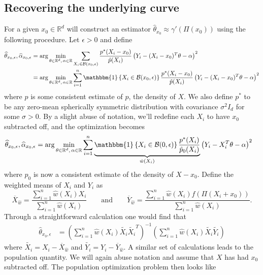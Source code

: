 \documentclass[11pt]{article}
\begin{document}
\subsection{Recovering the underlying curve}
For a given $x_0 \in \mathbb{R}^d$ will construct an estimator $\widehat{\theta}_{x_0} \approx \gamma'(\Pi(x_0))$ using the following procedure. Let $\epsilon > 0$ and define
\begin{align} 
\widehat{\theta}_{x_0,\epsilon}, \widehat{\alpha}_{x_0, \epsilon} &= \arg\min_{\theta \in \mathbb{R}^d,\, \alpha \in \mathbb{R}} \sum_{X_i \in \mathcal{B}(x_0, \epsilon)}\frac{p^*(X_i - x_0)}{\hat{p}(X_i)}\left(Y_i - (X_i - x_0)^{T}\theta - \alpha\right)^2 \\
&= \arg\min_{\theta \in \mathbb{R}^d,\, \alpha \in \mathbb{R}} \sum_{i = 1}^{n}\mathbbm{1}\left\{X_i \in \mathcal{B}(x_0, \epsilon)\right\}\frac{p^*(X_i - x_0)}{\hat{p}(X_i)}\left(Y_i - (X_i - x_0)^{T}\theta - \alpha\right)^2
\end{align}
where $\hat{p}$ is some consistent estimate of $p$, the density of $X$. We also define $p^*$ to be any zero-mean spherically symmetric distribution with covariance $\sigma^2I_d$ for some $\sigma > 0$. By a slight abuse of notation, we'll redefine each $X_i$ to have $x_0$ subtracted off, and the optimization becomes 
\begin{align} 
\widehat{\theta}_{x_0,\epsilon}, \widehat{\alpha}_{x_0, \epsilon} &= \arg\min_{\theta \in \mathbb{R}^d,\, \alpha \in \mathbb{R}} \sum_{i = 1}^{n}\underbrace{\mathbbm{1}\left\{X_i \in \mathcal{B}(0, \epsilon)\right\}\frac{p^*(X_i)}{\hat{p}_0(X_i)}}_{\hat{w}(X_i)}\left(Y_i - X_i^{T}\theta - \alpha\right)^2
\end{align}
where $\hat{p}_0$ is now a consistent estimate of the density of $X - x_0$. Define the weighted means of $X_i$ and $Y_i$ as 
\begin{equation}
    \overline{X}_{\hat{w}} = \frac{\sum_{i = 1}^n \hat{w}(X_i)X_i}{\sum_{i = 1}^n \hat{w}(X_i)} \qquad \text{and} \qquad \overline{Y}_{\hat{w}} = \frac{\sum_{i = 1}^n \hat{w}(X_i)f(\Pi(X_i+x_0))}{\sum_{i = 1}^n \hat{w}(X_i)}.
\end{equation}
Through a straightforward calculation one would find that
\begin{align}
    \widehat{\theta}_{x_0,\epsilon} &= \left(\sum_{i = 1}^n\hat{w}(X_i)\tilde{X_i}\tilde{X_i}^T\right)^{-1}\left(\sum_{i = 1}^n\hat{w}(X_i)\tilde{X_i}\tilde{Y_i}\right) \label{eq: sample est closed form}
\end{align}
where $\tilde{X_i} = X_i - \overline{X}_{\hat{w}}$ and $\tilde{Y_i} = Y_i - \overline{Y}_{\hat{w}}$. A similar set of calculations leads to the population quantity. We will again abuse notation and assume that $X$ has had $x_0$ subtracted off. The population optimization problem then looks like
\end{document}
